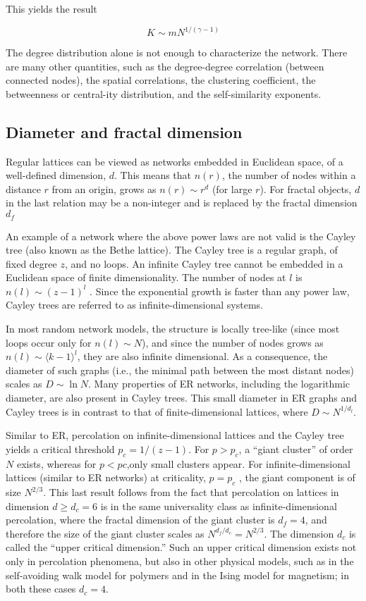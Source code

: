 \nd This yields the result

\begin{equation}
    K \sim m N^{1/(\gamma -1)}
\end{equation}

\nd The degree distribution alone is not enough to characterize the network. There are many other quantities, such as the degree-degree correlation (between connected nodes), the spatial correlations, the clustering coefficient, the betweenness or central-ity distribution, and the self-similarity exponents.

\subsection{Diameter and fractal dimension}

Regular lattices can be viewed as networks embedded in Euclidean space, of a well-defined dimension, $d$. This means that $n(r)$, the number of nodes within a distance $r$ from an origin, grows as $n(r) \sim r^d$ (for large $r$). For fractal objects, $d$ in the last relation may be a non-integer and is replaced by the fractal dimension $d_f$ \s

\nd An example of a network where the above power laws are not valid is the Cayley tree (also known as the Bethe lattice). The Cayley tree is a regular graph, of fixed degree $z$, and no loops. An infinite Cayley tree cannot be embedded in a Euclidean space of finite dimensionality. The number of nodes at $l$ is $n(l) \sim (z - 1)^l$ . Since the exponential growth is faster than any power law, Cayley trees are referred to as infinite-dimensional systems. \s

\nd In most random network models, the structure is locally tree-like (since most loops occur only for $n(l) \sim N$), and since the number of nodes grows as $n(l) \sim \langle k - 1 \rangle^l$, they are also infinite dimensional. As a consequence, the diameter of such graphs (i.e., the minimal path between the most distant nodes) scales as $D \sim \ln N$. Many properties of ER networks, including the logarithmic diameter, are also present in Cayley trees. This small diameter in ER graphs and Cayley trees is in contrast to that of finite-dimensional lattices, where $D \sim N^{1/d_l}$. \s

\nd Similar to ER, percolation on infinite-dimensional lattices and the Cayley tree  yields a critical threshold $p_c = 1/(z - 1)$. For $p > p_c$, a “giant cluster” of order $N$ exists, whereas for $p < pc$,only small clusters appear. For infinite-dimensional lattices (similar to ER networks) at criticality, $p =
p_c$ , the giant component is of size $N^{2/3}$. This last result follows from the fact that percolation on lattices in dimension $d \geq d_c = 6$ is in the same universality class as infinite-dimensional percolation, where the fractal dimension of the giant cluster is $d_f = 4$, and therefore the size of the giant cluster scales as $N^{d_f/d_c} = N^{2/3}$. The dimension $d_c$ is called the “upper critical dimension.” Such an upper critical dimension exists not only in percolation phenomena, but also in other physical models, such as in the self-avoiding walk model for polymers and in the Ising model for magnetism; in both these cases $d_c = 4$.

